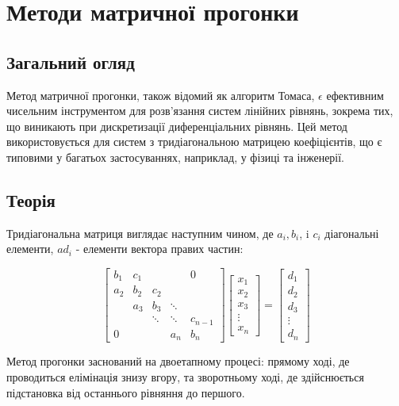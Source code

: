 \chapter{Методи матричної прогонки}

\section{Загальний огляд}

Метод матричної прогонки, також відомий як алгоритм Томаса, $\epsilon$ ефективним чисельним інструментом 
для розв'язання систем лінійних рівнянь, зокрема тих, що виникають при дискретизації диференціальних рівнянь. 
Цей метод використовується для систем з тридіагональною матрицею коефіцієнтів, що є типовими у багатьох застосуваннях, 
наприклад, у фізиці та інженерії.

\section{Теорія}

Тридіагональна матриця виглядає наступним чином, де $a_{i}, b_{i}$, i $c_{i}$ діагональні елементи, $a d_{i}$ - елементи вектора правих частин:

$$
\left[\begin{array}{ccccc}
b_{1} & c_{1} & & & 0 \\
a_{2} & b_{2} & c_{2} & & \\
& a_{3} & b_{3} & \ddots & \\
& & \ddots & \ddots & c_{n-1} \\
0 & & & a_{n} & b_{n}
\end{array}\right]\left[\begin{array}{c}
x_{1} \\
x_{2} \\
x_{3} \\
\vdots \\
x_{n}
\end{array}\right]=\left[\begin{array}{c}
d_{1} \\
d_{2} \\
d_{3} \\
\vdots \\
d_{n}
\end{array}\right]
$$

Метод прогонки заснований на двоетапному процесі: прямому ході, де проводиться елімінація знизу вгору, та зворотньому ході, де здійснюється підстановка від останнього рівняння до першого.

